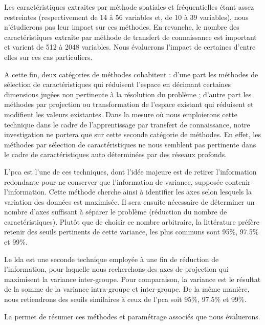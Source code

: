 Les caractéristiques extraites par méthode spatiales et fréquentielles étant assez restreintes (respectivement de 14 à 56 variables et, de 10 à 39 variables), nous n'étudierons pas leur impact sur ces méthodes. En revanche, le nombre des caractéristiques extraite par méthode de transfert de connaissance est important et varient de 512 à 2048 variables. Nous évaluerons l'impact de certaines d'entre elles sur ces cas particuliers.\par

A cette fin, deux catégories de méthodes cohabitent : d'une part les méthodes de sélection de caractéristiques qui réduisent l'espace en décimant certaines dimensions jugées non pertinente à la résolution du problème ; d'autre part les méthodes par projection ou transformation de l'espace existant qui réduisent et modifient les valeurs existantes. Dans la mesure où nous emploierons cette technique dans le cadre de l'apprentissage par transfert de connaissance, notre investigation ne portera que sur cette seconde catégorie de méthodes. En effet, les méthodes par sélection de caractéristiques ne nous semblent pas pertinente dans le cadre de caractéristiques auto déterminées par des réseaux profonds.\par

L'\gls{pca} est l'une de ces techniques, dont l'idée majeure est de retirer l'information redondante pour ne conserver que l'information de variance, supposée contenir l'information. Cette méthode cherche ainsi à identifier les axes selon lesquels la variation des données est maximisée. Il sera ensuite nécessaire de déterminer un nombre d'axes suffisant à séparer le problème (réduction du nombre de caractéristiques). Plutôt que de choisir ce nombre arbitraire, la littérature préfère retenir des seuils pertinents de cette variance, les plus communs sont 95\%, 97.5\% et 99\%.\par

Le \gls{lda} est une seconde technique employée à une fin de réduction de l'information, pour laquelle nous recherchons des axes de projection qui maximisent la variance inter-groupe. Pour comparaison, la variance est le résultat de la somme de la variance intra-groupe et inter-groupe. De la même manière, nous retiendrons des seuils similaires à ceux de l'\gls{pca} soit 95\%, 97.5\% et 99\%.\par

La  permet de résumer ces méthodes et paramétrage associés que nous évaluerons.\par 

